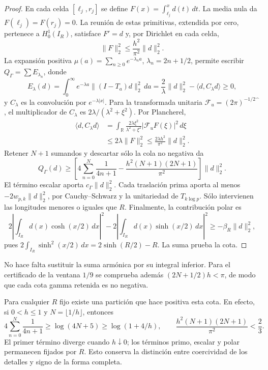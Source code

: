 \begin{proof}
En cada celda \([\ell_j,r_j]\) se define
\(F(x)=\int_{\ell_j}^x d(t)\,dt\). La media nula da
\(F(\ell_j)=F(r_j)=0\). La reunión de estas primitivas, extendida
por cero, pertenece a \(H_0^1(I_R)\), satisface \(F'=d\) y, por
Dirichlet en cada celda,
\begin{equation}
\|F\|_2^2\leq\frac{h^2}{\pi^2}\|d\|_2^2.
\label{schur-add-primitiva}
\end{equation}
La expansión positiva
\(\mu(a)=\sum_{n\geq0}e^{-\lambda_n a}\), \(\lambda_n=2n+1/2\),
permite escribir \(Q_\Gamma=\sum E_{\lambda_n}\), donde
\begin{equation}
E_\lambda(d)=\int_0^\infty e^{-\lambda a}
 \|(I-T_a)d\|_2^2\,da
 =\frac2\lambda\|d\|_2^2-\langle d,C_\lambda d\rangle\geq0,
\label{schur-add-energia-lambda}
\end{equation}
y \(C_\lambda\) es la convolución por \(e^{-\lambda|x|}\).
Para la transformada unitaria
\(\mathcal F_u=(2\pi)^{-1/2}\widehat{\phantom f}\), el multiplicador
de \(C_\lambda\) es \(2\lambda/(\lambda^2+\xi^2)\). Por Plancherel,
\begin{equation}
\begin{aligned}
\langle d,C_\lambda d\rangle
&=\int_{\mathbb R}\frac{2\lambda\xi^2}{\lambda^2+\xi^2}
 |\mathcal F_uF(\xi)|^2\,d\xi\\
&\leq2\lambda\|F\|_2^2
 \leq\frac{2\lambda h^2}{\pi^2}\|d\|_2^2 .
\end{aligned}
\label{schur-add-cota-convolucion}
\end{equation}
Retener \(N+1\) sumandos y descartar sólo la cola no negativa da
\[
Q_\Gamma(d)\geq
\left[4\sum_{n=0}^N\frac1{4n+1}
-\frac{h^2(N+1)(2N+1)}{\pi^2}\right]\|d\|_2^2.
\]
El término escalar aporta \(c_\Gamma\|d\|_2^2\).
Cada traslación prima aporta al menos
\(-2w_{p,k}\|d\|_2^2\), por Cauchy--Schwarz y la unitariedad
de \(T_{k\log p}\). Sólo intervienen las longitudes menores o iguales
que \(R\).
Finalmente, la contribución polar es
\[
2\left|\int_{I_R}d(x)\cosh(x/2)\,dx\right|^2
-2\left|\int_{I_R}d(x)\sinh(x/2)\,dx\right|^2
\geq-\beta_R\|d\|_2^2,
\]
pues \(2\int_{I_R}\sinh^2(x/2)\,dx=2\sinh(R/2)-R\).
La suma prueba la cota.
\end{proof}
No hace falta sustituir la suma armónica por su integral inferior.
Para el certificado de la ventana \(1/9\) se comprueba además
\((2N+1/2)h<\pi\), de modo que cada cota gamma retenida es no negativa.

Para cualquier \(R\) fijo existe una partición que hace positiva esta
cota. En efecto, si \(0<h\leq1\) y \(N=\lfloor1/h\rfloor\), entonces
\[
4\sum_{n=0}^N\frac1{4n+1}\geq\log(4N+5)\geq\log(1+4/h),
\qquad
\frac{h^2(N+1)(2N+1)}{\pi^2}<\frac23.
\]
El primer término diverge cuando \(h\downarrow0\); los términos
primo, escalar y polar permanecen fijados por \(R\). Esto conserva
la distinción entre coercividad de los detalles y signo de la
forma completa.

